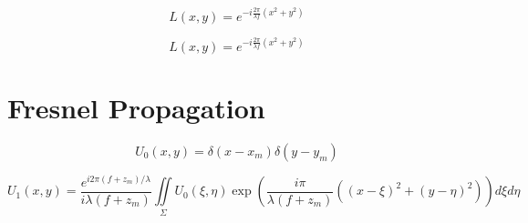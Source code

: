 \documentclass{kepfl}
\begin{document}
\begin{equation}
L(x,y) = {e^{ - i\frac{{2\pi }}{{\lambda f}}({x^2} + {y^2})}}
\end{equation}

\begin{equation}	
L(x,y) = {e^{ - i\frac{{2\pi }}{{\lambda f}}({x^2} + {y^2})}}
\end{equation}

\section{Fresnel Propagation}
\begin{equation}
	{U_0}(x,y) = \delta (x - {x_m})\delta (y - {y_m})
\end{equation}

\begin{equation}
	{U_1}(x,y) = \frac{{{e^{i2\pi (f + {z_m})/\lambda }}}}{{i\lambda (f + {z_m})}}\iint\limits_\Sigma  {{U_0}(\xi ,\eta )\exp \left( {\frac{{i\pi }}{{\lambda (f + {z_m})}}\left( {{{(x - \xi )}^2} + {{(y - \eta )}^2}} \right)} \right)d\xi d\eta }
\end{equation}
\end{document}
